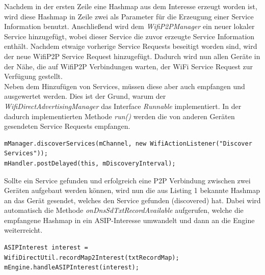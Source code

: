 Nachdem in der ersten Zeile eine Hashmap aus dem Interesse erzeugt worden ist, wird diese Hashmap in Zeile zwei als Parameter für die Erzeugung einer Service Information benutzt. Anschließend wird dem \textit{WifiP2PManager} ein neuer lokaler Service hinzugefügt, wobei dieser Service die zuvor erzeugte Service Information enthält. Nachdem etwaige vorherige Service Requests beseitigt worden sind, wird der neue WifiP2P Service Request hinzugefügt. Dadurch wird nun allen Geräte in der Nähe, die auf WifiP2P Verbindungen warten, der WiFi Service Request zur Verfügung gestellt.
\\Neben dem Hinzufügen von Services, müssen diese aber auch empfangen und ausgewertet werden. Dies ist der Grund, warum der \textit{WifiDirectAdvertisingManager} das Interface \textit{Runnable} implementiert. In der dadurch implementierten Methode \textit{run()} werden die von anderen Geräten gesendeten Service Requests empfangen.\newline
\lstset{language=Java, caption=Erkennung von Services, label=DescriptiveLabel, numbers=left, numbersep=1em, breaklines=true, basicstyle=\small}
\begin{lstlisting}
mManager.discoverServices(mChannel, new WifiActionListener("Discover Services"));
mHandler.postDelayed(this, mDiscoveryInterval);
\end{lstlisting}
Sollte ein Service gefunden und erfolgreich eine P2P Verbindung zwischen zwei Geräten aufgebaut werden können, wird nun die aus Listing 1 bekannte Hashmap an das Gerät gesendet, welches den Service gefunden (discovered) hat. Dabei wird automatisch die Methode \textit{onDnsSdTxtRecordAvailable} aufgerufen, welche die empfangene Hashmap in ein ASIP-Interesse umwandelt und dann an die Engine weiterreicht.\newline
\lstset{language=Java, caption=Vewertung des Interesses, label=DescriptiveLabel, numbers=left, numbersep=1em, breaklines=true, basicstyle=\small}
\begin{lstlisting}
ASIPInterest interest = WifiDirectUtil.recordMap2Interest(txtRecordMap);
mEngine.handleASIPInterest(interest);
\end{lstlisting}  

